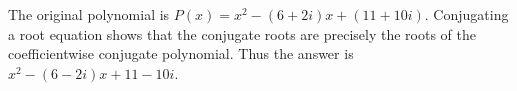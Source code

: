 The original polynomial is $P(x)=x^2-(6+2i)x+(11+10i)$. Conjugating a root equation shows that the conjugate roots are precisely the roots of the coefficientwise conjugate polynomial. Thus the answer is $\boxed{x^2-(6-2i)x+11-10i}$.
